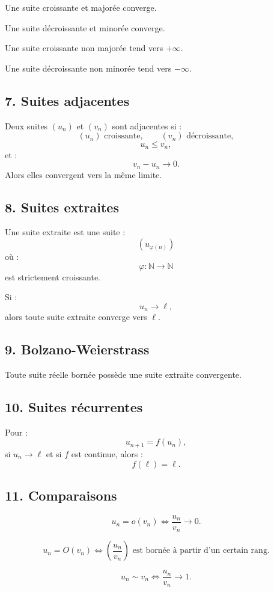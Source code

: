 \documentclass[11pt,a4paper]{article}
\newcommand{\N}{\mathbb N}
\newcommand{\ssi}{\Longleftrightarrow}
\begin{document}
Une suite croissante et majorée converge.

Une suite décroissante et minorée converge.

Une suite croissante non majorée tend vers \(+\infty\).

Une suite décroissante non minorée tend vers \(-\infty\).

\subsection*{7. Suites adjacentes}

Deux suites \((u_n)\) et \((v_n)\) sont adjacentes si :
\[
(u_n)\text{ croissante},\qquad (v_n)\text{ décroissante},
\]
\[
u_n\leq v_n,
\]
et :
\[
v_n-u_n\to0.
\]
Alors elles convergent vers la même limite.

\subsection*{8. Suites extraites}

Une suite extraite est une suite :
\[
(u_{\varphi(n)})
\]
où :
\[
\varphi:\N\to\N
\]
est strictement croissante.

Si :
\[
u_n\to\ell,
\]
alors toute suite extraite converge vers \(\ell\).

\subsection*{9. Bolzano-Weierstrass}

Toute suite réelle bornée possède une suite extraite convergente.

\subsection*{10. Suites récurrentes}

Pour :
\[
u_{n+1}=f(u_n),
\]
si \(u_n\to\ell\) et si \(f\) est continue, alors :
\[
f(\ell)=\ell.
\]

\subsection*{11. Comparaisons}

\[
u_n=o(v_n)
\ssi
\frac{u_n}{v_n}\to0.
\]

\[
u_n=O(v_n)
\ssi
\left(\frac{u_n}{v_n}\right)\text{ est bornée à partir d'un certain rang}.
\]

\[
u_n\sim v_n
\ssi
\frac{u_n}{v_n}\to1.
\]
\end{document}
